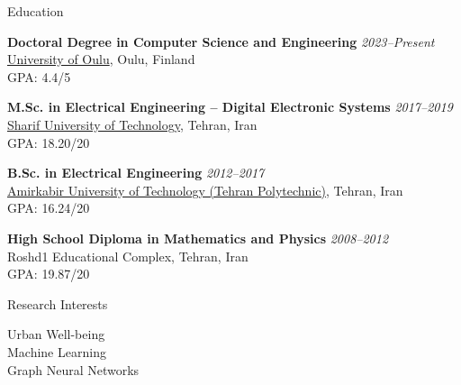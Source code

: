 \documentclass{resume} %
\begin{document}

\begin{rSection}{Education}
\vspace{+.1cm}

{\bf Doctoral Degree in Computer Science and Engineering} \hfill {\em 2023--Present} \\
\href{https://www.oulu.fi/}{University of Oulu}, Oulu, Finland \\
GPA: 4.4/5

{\bf M.Sc. in Electrical Engineering -- Digital Electronic Systems} \hfill {\em 2017--2019} \\
\href{http://www.en.sharif.edu/}{Sharif University of Technology}, Tehran, Iran \\
GPA: 18.20/20

{\bf B.Sc. in Electrical Engineering} \hfill {\em 2012--2017} \\
\href{https://www.aut.ac.ir/en}{Amirkabir University of Technology (Tehran Polytechnic)}, Tehran, Iran \\
GPA: 16.24/20

{\bf High School Diploma in Mathematics and Physics} \hfill {\em 2008--2012} \\
Roshd1 Educational Complex, Tehran, Iran \\
GPA: 19.87/20

\end{rSection}


\begin{rSection}{Research Interests}
\vspace{+.1cm}

Urban Well-being \\
Machine Learning \\
Graph Neural Networks

\end{rSection}

\end{document}
